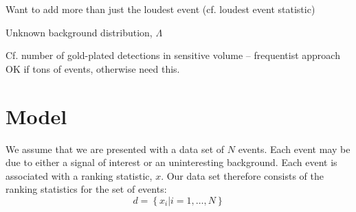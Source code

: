 \documentclass[aps,prd]{revtex4-1}
\newcommand{\mathset}[1]{\left\{ #1 \right\}}
\begin{document}
Want to add more than just the loudest event (cf. loudest event
statistic)

Unknown background distribution, $\Lambda$

Cf. number of gold-plated detections in sensitive volume --
frequentist approach OK if tons of events, otherwise need this.


\section{Model}

We assume that we are presented with a data set of $N$ events.  Each
event may be due to either a signal of interest or an uninteresting
background.  Each event is associated with a ranking statistic, $x$.
Our data set therefore consists of the ranking statistics for the set
of events:
\begin{equation}
  d = \mathset{ x_i | i = 1, \ldots, N }
\end{equation}
\end{document}
